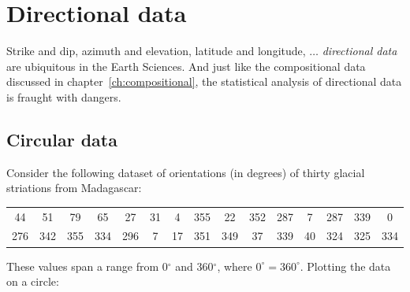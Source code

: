 \chapter{Directional data}
\label{ch:directional}

Strike and dip, azimuth and elevation, latitude and longitude,
$\ldots$ \textit{directional data} are ubiquitous in the Earth
Sciences. And just like the compositional data discussed in
chapter~\ref{ch:compositional}, the statistical analysis of
directional data is fraught with dangers.

\section{Circular data}
\label{sec:circular}

Consider the following dataset of orientations (in degrees) of thirty
glacial striations from Madagascar:

\begin{center}
\begin{tabular}{ccccccccccccccc}
44 & 51 & 79 & 65 & 27 & 31 & 4 & 355 & 22 & 352 & 287 & 7 & 287 & 339 & 0 \\
276 & 342 & 355 & 334 & 296 & 7 & 17 & 351 & 349 & 37 & 339 & 40 & 324 & 325 & 334\\
\end{tabular}
\end{center}

These values span a range from 0$^{\circ}$ and 360$^{\circ}$, where
$0^{\circ}=360^{\circ}$. Plotting the data on a circle:

